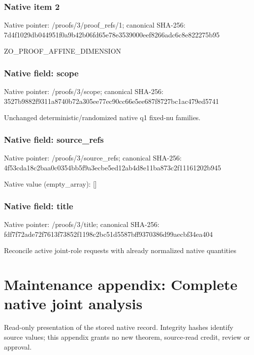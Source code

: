 \documentclass[10pt,a4paper]{article}
\begin{document}
\subsubsection{Native item 2}
Native pointer: /proofs/3/proof\_\allowbreak{}refs/1; canonical SHA-256: 7d4f1029db044951f0a9b42b06fd65e78e3539000eef8266adc6c8e822275b95

\begingroup\raggedright\sloppy ZO\_\allowbreak{}PROOF\_\allowbreak{}AFFINE\_\allowbreak{}DIMENSION\par\endgroup

\subsubsection{Native field: scope}
Native pointer: /proofs/3/scope; canonical SHA-256: 3527b9882f9311a8740b72a305ee77ec90cc66e5ee687f8727bc1ac479ed5741

\begingroup\raggedright\sloppy Unchanged deterministic/\allowbreak{}randomized native q1 fixed-nu families.\par\endgroup

\subsubsection{Native field: source\_\allowbreak{}refs}
Native pointer: /proofs/3/source\_\allowbreak{}refs; canonical SHA-256: 4f53cda18c2baa0c0354bb5f9a3ecbe5ed12ab4d8e11ba873c2f11161202b945

Native value (empty\_\allowbreak{}array): []

\subsubsection{Native field: title}
Native pointer: /proofs/3/title; canonical SHA-256: fdf7f72ade72f7613f73852f1198c2bc51d5587bff9370386d99aecbf34ea404

\begingroup\raggedright\sloppy Reconcile active joint-role requests with already normalized native quantities\par\endgroup

\section{Maintenance appendix: Complete native joint analysis}
Read-only presentation of the stored native record. Integrity hashes identify source values; this appendix grants no new theorem, source-read credit, review or approval.
\end{document}
